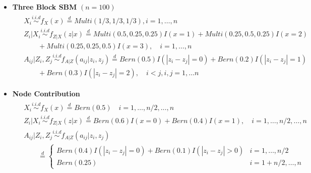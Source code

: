 \documentclass[11pt]{article}
\theoremstyle{definition}
\begin{document}
\begin{itemize}	
	\item \textbf{Three Block SBM} $(n = 100)$
	\vspace*{-0.5cm}
	\begin{equation}
	\label{eq:Three}
	\begin{gathered}
	\begin{aligned}
	&  X_{i} \overset{i.i.d}{\sim} f_{X}(x)   \stackrel{d}{=}  Multi(1/3, 1/3, 1/3), i = 1, \ldots , n \\ 
	&  Z_{i} | X_{i}  \overset{i.i.d}{\sim}    f_{Z|X}(z|x)  \stackrel{d}{=}   Multi(0.5, 0.25, 0.25) I( x = 1 ) +   Multi(0.25, 0.5, 0.25) I (x = 2)  \qquad  \\ & \quad \quad + Multi(0.25, 0.25, 0.5)I(x = 3), \quad  i = 1,\ldots,n  \\
	&  A_{ij} | Z_{i}, Z_{j}   \overset{i.i.d}{\sim}   f_{A|Z}(a_{ij} | z_{i}, z_{j}) \stackrel{d}{=}  Bern(0.5) I ( |z_{i} - z_{j}| = 0 )  + Bern(0.2) I(|z_{i} - z_{j}| = 1) \\ & \quad \quad + Bern(0.3) I (|z_{i} - z_{j}| = 2),  \quad i < j, i,j=1, \ldots n 
	\end{aligned}
	\end{gathered}
	\end{equation}
		
	\item \textbf{Node Contribution}
	\vspace*{-0.5cm}
	\begin{equation}
	\begin{gathered}
	\begin{aligned}
	& X_{i} \overset{i.i.d}{\sim} f_{X}(x)   \stackrel{d}{=}  Bern(0.5)  \quad i = 1, \ldots ,n/2, \ldots, n \\ & Z_{i} | X_{i}  \overset{i.i.d}{\sim}    f_{Z|X}(z|x)  \stackrel{d}{=}   Bern(0.6) I(x = 0) + Bern(0.4) I(x=1), \quad  i = 1,\ldots,n/2, \ldots, n \\
	& A_{ij} | Z_{i}, Z_{j}   \overset{i.i.d}{\sim}   f_{A|Z}(a_{ij} | z_{i}, z_{j})  \\ & \quad  \quad \stackrel{d}{=} \left\{  \begin{array}{cc} Bern(0.4) I(|z_{i} - z_{j}| = 0)  + Bern(0.1) I(|z_{i} - z_{j}| > 0) & i = 1,\ldots,n/2 \\   Bern(0.25)  & i=1+n/2, \ldots, n  \end{array} \right.
	\end{aligned}
	\end{gathered}
	\label{eq:contri}
	\end{equation}
	
\end{itemize}
\end{document}
